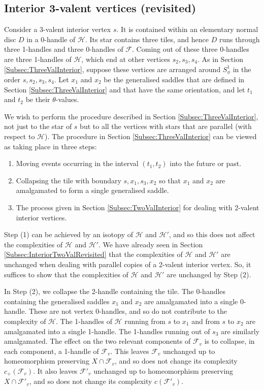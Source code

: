 \documentclass[oneside]{amsart}
\numberwithin{equation}{section}
\theoremstyle{plain}
\theoremstyle{definition}
\newcommand{\calF}{\mathcal{F}}
\begin{document}
\subsection{Interior 3-valent vertices (revisited)}

Consider a 3-valent interior vertex $s$. It is contained within an elementary normal disc $D$ in a 0-handle
of $\mathcal{H}$. Its star contains three tiles, and hence $D$ runs through three 1-handles
and three 0-handles of $\mathcal{F}$. Coming out of these three 0-handles are three 1-handles
of $\mathcal{H}$, which end at other vertices $s_2, s_3, s_4$. As in Section \ref{Subsec:ThreeValInterior},
suppose these vertices are arranged around $S^1_\phi$ in the order
$s, s_2, s_3, s_4$. Let $x_1$ and $x_2$ be the generalised saddles that
are defined in Section \ref{Subsec:ThreeValInterior} and that have the same orientation, and let $t_1$ and $t_2$ be their
$\theta$-values.

We wish to perform the procedure described in
Section \ref{Subsec:ThreeValInterior}, not just to the star of $s$ but to all the vertices with stars that
are parallel (with respect to $\mathcal{H}$). The procedure in Section \ref{Subsec:ThreeValInterior}
can be viewed as taking place in three steps:
\begin{enumerate}
\item Moving events occurring in the interval $(t_1, t_2)$ into the
future or past.
\item Collapsing the tile with boundary $s, x_1, s_3, x_2$ so that
$x_1$ and $x_2$ are amalgamated to form a single generalised saddle.
\item The process given in Section \ref{Subsec:TwoValInterior} for dealing with 2-valent
interior vertices. 
\end{enumerate}

Step (1) can be achieved by an isotopy of $\mathcal{H}$ and $\mathcal{H}'$, and so this does not affect
the complexities of $\mathcal{H}$  and $\mathcal{H}'$. We have already seen in Section \ref{Subsec:InteriorTwoValRevisited} that the
complexities of $\mathcal{H}$ and $\mathcal{H}'$ are unchanged when dealing with parallel copies of a
2-valent interior vertex. So, it suffices to show that the complexities of $\mathcal{H}$ and $\mathcal{H}'$
are unchanged by Step (2).

In Step (2), we collapse the 2-handle containing the tile. The 0-handles containing
the generalised saddles $x_1$ and $x_2$ are amalgamated into a single 0-handle. These are not
vertex 0-handles, and so do not contribute to the complexity of $\mathcal{H}$.
The 1-handles of $\mathcal{H}$ running from $s$ to $x_1$ and from $s$ to $x_2$
are amalgamated into a single 1-handle. The 1-handles running out of $s_3$
are similarly amalgamated. The effect on the two relevant components of 
$\mathcal{F}_v$ is to collapse, in each component, a 1-handle of $\mathcal{F}_v$. This leaves
$\mathcal{F}_v$ unchanged up to homeomorphism preserving $X \cap \mathcal{F}_v$, and so does not change its
complexity $c_+(\calF_v)$. It also leaves $\mathcal{F}'_v$ unchanged up to homeomorphism preserving $X \cap \mathcal{F}'_v$, and so does not change its
complexity $c(\calF'_v)$.
\end{document}
